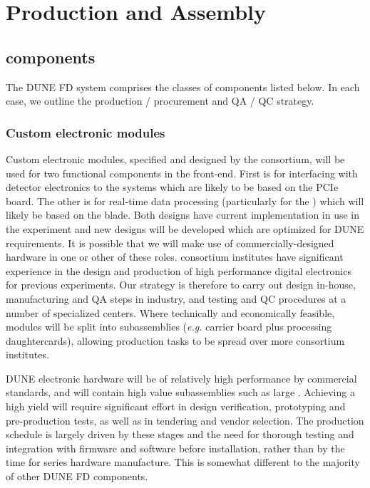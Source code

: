 
\section{Production and Assembly}
\label{sec:fd-daq-prod-assy}

\subsection{ components}

The DUNE FD  system comprises the classes of components listed below. In each case, we outline the production / procurement and QA / QC strategy.

\subsubsection{Custom electronic modules}


Custom electronic modules, specified and designed by the 
consortium, will be used for two functional components in the 
front-end. 
First is for interfacing with detector electronics to the 
 systems which are likely to be based on the 
PCIe board.
The other is for real-time data processing (particularly for the
 ) which will likely be based on the
  blade.
Both designs have current implementation in use in the 
experiment and new designs will be developed which are optimized for
DUNE requirements.
It is possible that we will make use of commercially-designed hardware
in one or other of these roles.  consortium institutes have
significant experience in the design and production of high
performance digital electronics for previous experiments.
Our strategy is therefore to carry out design in-house, manufacturing
and QA steps in industry, and testing and QC procedures at a number of
specialized centers.
Where technically and economically feasible, modules will be split
into subassemblies ({\it e.g.} carrier board plus processing
daughtercards), allowing production tasks to be spread over more
consortium institutes.

DUNE electronic hardware will be of relatively high performance by commercial standards, and will contain high value subassemblies such as large . Achieving a high yield will require significant effort in design verification, prototyping and pre-production tests, as well as in tendering and vendor selection. The production schedule is largely driven by these stages and the need for thorough testing and integration with firmware and software before installation, rather than by the time for series hardware manufacture. This is somewhat different to the majority of other DUNE FD components.

